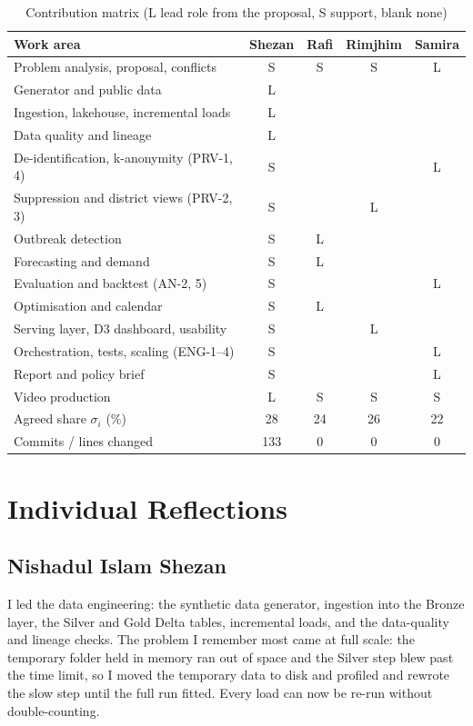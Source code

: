 \begin{table}[htbp]
\caption{Contribution matrix (L lead role from the proposal, S support, blank none)}
\label{tab:contrib}
\centering\footnotesize
\setlength{\tabcolsep}{2pt}
\begin{tabular}{@{}>{\raggedright\arraybackslash}p{4.8cm}cccc@{}}
\toprule
Work area & Shezan & Rafi & Rimjhim & Samira \\
\midrule
Problem analysis, proposal, conflicts & S & S & S & L \\
Generator and public data & L & & & \\
Ingestion, lakehouse, incremental loads & L & & & \\
Data quality and lineage & L & & & \\
De-identification, k-anonymity (PRV-1, 4) & S & & & L \\
Suppression and district views (PRV-2, 3) & S & & L & \\
Outbreak detection & S & L & & \\
Forecasting and demand & S & L & & \\
Evaluation and backtest (AN-2, 5) & S & & & L \\
Optimisation and calendar & S & L & & \\
Serving layer, D3 dashboard, usability & S & & L & \\
Orchestration, tests, scaling (ENG-1--4) & S & & & L \\
Report and policy brief & S & & & L \\
Video production & L & S & S & S \\
\midrule
Agreed share $\sigma_i$ (\%) & 28 & 24 & 26 & 22 \\
Commits / lines changed & 133 & 0 & 0 & 0 \\
\bottomrule
\end{tabular}
\end{table}

\section{Individual Reflections}\label{app:reflections}
\subsection*{Nishadul Islam Shezan}
I led the data engineering: the synthetic data generator, ingestion into the Bronze layer, the Silver and Gold
Delta tables, incremental loads, and the data-quality and lineage checks. The problem I remember most came at full
scale: the temporary folder held in memory ran out of space and the Silver step blew past the time limit, so I moved
the temporary data to disk and profiled and rewrote the slow step until the full run fitted. Every load can now be
re-run without double-counting.

